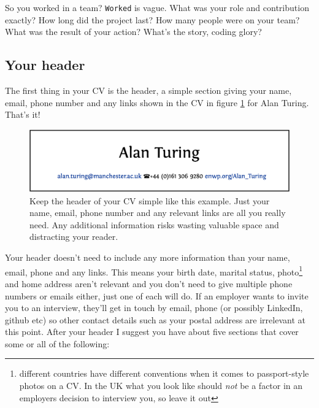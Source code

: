 \documentclass[
]{book}
\begin{document}
So you worked in a team? \texttt{Worked} is vague. What was your role and contribution exactly? How long did the project last? How many people were on your team? What was the result of your action? What's the story, coding glory? \citep{whatsthestory}

\hypertarget{mycvpd}{%
\subsection{Your header}\label{mycvpd}}

The first thing in your CV is the header, a simple section giving your name, email, phone number and any links shown in the CV in figure \ref{fig:turinghead-fig} for Alan Turing. That's it!

\begin{figure}

{\centering \includegraphics[width=0.98\linewidth]{images/alan-turing-header} 

}

\caption{Keep the header of your CV simple like this example. Just your name, email, phone number and any relevant links are all you really need. Any additional information risks wasting valuable space and distracting your reader.}\label{fig:turinghead-fig}
\end{figure}



Your header doesn't need to include any more information than your name, email, phone and any links. This means your birth date, marital status, photo\footnote{different countries have different conventions when it comes to passport-style photos on a CV. In the UK what you look like should \emph{not} be a factor in an employers decision to interview you, so leave it out} and home address aren't relevant and you don't need to give multiple phone numbers or emails either, just one of each will do. If an employer wants to invite you to an interview, they'll get in touch by email, phone (or possibly LinkedIn, github etc) so other contact details such as your postal address are irrelevant at this point. After your header I suggest you have about five sections that cover some or all of the following:
\end{document}
